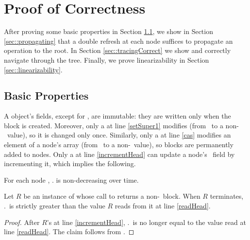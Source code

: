 
\section{Proof of Correctness}
\label{sec::correctness}

After proving some basic properties in Section \ref{sec::basicProperties},
we show in Section \ref{sec::propagating} that a double refresh at each node
suffices to propagate an operation to the root.
In Section \ref{sec::tracingCorrect} we show  and 
correctly navigate through the  tree.
Finally, we prove linearizability in Section \ref{sec::linearizability}.

\subsection{Basic Properties}
\label{sec::basicProperties}

A  object's fields, except for , are immutable:  they are written only 
when the block is created.
Moreover, only a  at line \ref{setSuper1}  modifies    
(from \nl\ to a non-\nl\ value), so it is changed only once.
Similarly, only a  at line \ref{cas} modifies an element of a node's  array 
(from \nl\ to a non-\nl\ value), so blocks are permanently added to nodes.
Only a  at line \ref{incrementHead} can update a node's \head\ field by incrementing it,
which implies the following.

\begin{observation} \label{nonDecreasingHead}
For each node ,  . is non-decreasing over time.
\end{observation}

\begin{observation} \label{lem::headInc}
Let $R$ be an instance of  whose call to  returns a non-\nl\ block.  When $R$ terminates, .\head\ is strictly greater than the value $R$ reads from it at line \ref{readHead}.
\end{observation}
\begin{proof}
After $R$'s  at line \ref{incrementHead}, .\head\ is no longer equal to the value 
read at line \ref{readHead}.  The claim follows from .
\end{proof}

